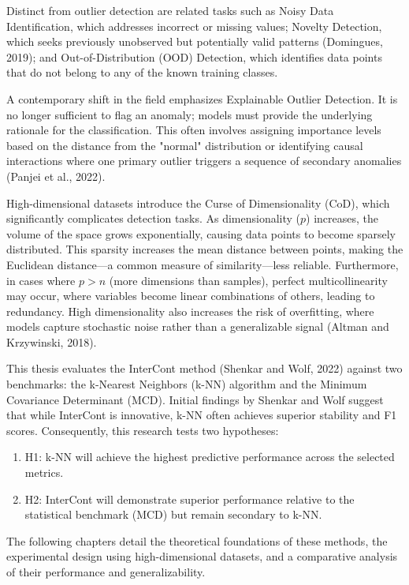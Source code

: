 Distinct from outlier detection are related tasks such as Noisy Data Identification, which addresses incorrect or missing values; Novelty Detection, which seeks previously unobserved but potentially valid patterns (Domingues, 2019); and Out-of-Distribution (OOD) Detection, which identifies data points that do not belong to any of the known training classes.

A contemporary shift in the field emphasizes Explainable Outlier Detection. 
It is no longer sufficient to flag an anomaly; models must provide the underlying rationale for the classification. 
This often involves assigning importance levels based on the distance from the "normal" distribution or identifying causal interactions where one primary outlier triggers a sequence of secondary anomalies (Panjei et al., 2022).


High-dimensional datasets introduce the Curse of Dimensionality (CoD), which significantly complicates detection tasks. 
As dimensionality ($p$) increases, the volume of the space grows exponentially, causing data points to become sparsely distributed. 
This sparsity increases the mean distance between points, making the Euclidean distance—a common measure of similarity—less reliable. 
Furthermore, in cases where $p > n$ (more dimensions than samples), perfect multicollinearity may occur, where variables become linear combinations of others, leading to redundancy. 
High dimensionality also increases the risk of overfitting, where models capture stochastic noise rather than a generalizable signal (Altman and Krzywinski, 2018).


This thesis evaluates the InterCont method (Shenkar and Wolf, 2022) against two benchmarks: the k-Nearest Neighbors (k-NN) algorithm and the Minimum Covariance Determinant (MCD). 
Initial findings by Shenkar and Wolf suggest that while InterCont is innovative, k-NN often achieves superior stability and F1 scores. 
Consequently, this research tests two hypotheses:

\begin{enumerate}
    \item H1: k-NN will achieve the highest predictive performance across the selected metrics.
    \item H2: InterCont will demonstrate superior performance relative to the statistical benchmark (MCD) but remain secondary to k-NN.
\end{enumerate}


The following chapters detail the theoretical foundations of these methods, the experimental design using high-dimensional datasets, and a comparative analysis of their performance and generalizability.